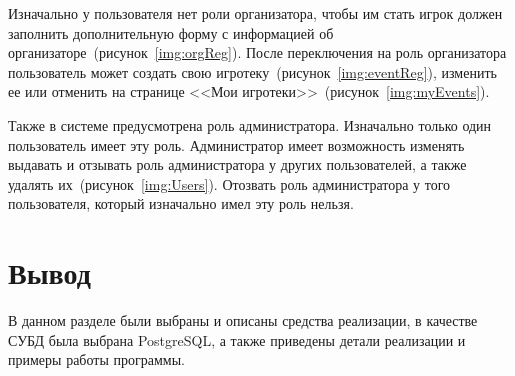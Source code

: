 
Изначально у пользователя нет роли организатора, чтобы им стать игрок должен
заполнить дополнительную форму с информацией об
организаторе~(рисунок~\ref{img:orgReg}). После переключения на роль организатора
пользователь может создать свою игротеку~(рисунок~\ref{img:eventReg}), изменить
ее или отменить на странице <<Мои игротеки>>~(рисунок~\ref{img:myEvents}).


Также в системе предусмотрена роль администратора. Изначально только один
пользователь имеет эту роль. Администратор имеет возможность изменять выдавать и
отзывать роль администратора у других пользователей, а также удалять
их~(рисунок~\ref{img:Users}). Отозвать роль администратора у того
пользователя, который изначально имел эту роль нельзя.


\section*{Вывод}

В данном разделе были выбраны и описаны средства реализации, в качестве СУБД
была выбрана PostgreSQL, а также приведены детали реализации и примеры работы
программы.
